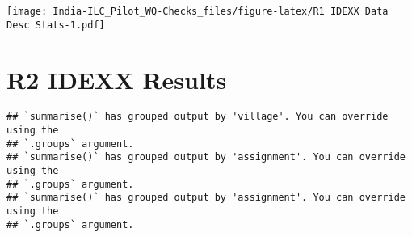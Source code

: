 \documentclass[
]{article}
\begin{document}
\texttt{[image: India-ILC\_Pilot\_WQ-Checks\_files/figure-latex/R1 IDEXX Data Desc Stats-1.pdf]}

\newpage

\hypertarget{r2-idexx-results}{%
\section{R2 IDEXX Results}\label{r2-idexx-results}}

\begin{verbatim}
## `summarise()` has grouped output by 'village'. You can override using the
## `.groups` argument.
## `summarise()` has grouped output by 'assignment'. You can override using the
## `.groups` argument.
## `summarise()` has grouped output by 'assignment'. You can override using the
## `.groups` argument.
\end{verbatim}
\end{document}
